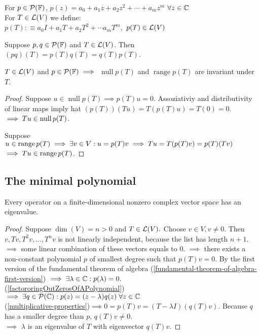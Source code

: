 \begin{mydef}
    For $p \in \mathcal{P} (\mathbb{F})$, $p(z) = a_0+a_1z+a_2z^2+\cdots+a_mz^m$
    $\forall z \in \mathbb{C}$\\
    For $T \in \mathcal{L} (V)$ we define: \\
    $p(T) :\equiv a_0 I + a_1 T + a_2 T^2 + \cdots a_m T^m,$ $p(T) \in \mathcal{L}(V)$
\end{mydef}



\setcounter{thm}{16}
\begin{thm}
    \label{multiplicative-properties}
    Suppose $p,q \in \mathcal{P} (\mathbb{F})$ and $T\in \mathcal{L} (V)$. Then $(p q)(T) = p(T) q(T) = q(T)p(T)$.
\end{thm}

\begin{thm}
    \label{null-space-and-range-of-p(T)-are-invariant-under-T}
    $T \in \mathcal{L}(V)$ and $p\in \mathcal{P} (\mathbb{F}) \implies$
    $\operatorname{null} p(T)$ and $\operatorname{range} p(T)$ are invariant under $T$.
\end{thm}
\begin{proof}
    Suppose $u\in \operatorname{null} p(T) \implies p(T)u = 0$. Assoziativiy and distributivity of linear maps imply hat $(p(T))(Tu)=T(p(T)u)=T(0)=0$.$\implies Tu \in \operatorname{null} p(T)$.

    Suppose $u \in \operatorname{range} p(T) \implies \exists v\in V: u=p(T)v \implies Tu=T(p(T)v)=p(T)(Tv)$ \\
    $\implies Tu \in \operatorname{range} p(T)$.
\end{proof}

\subsection{The minimal polynomial}

\begin{thm}
    Every operator on a finite-dimensional nonzero complex vector space has an eigenvalue.
\end{thm}
\begin{proof}
    Suppose $\dim(V)=n>0$ and $T\in \mathcal{L}(V).$ Choose $v\in V, v\neq0$. Then $v, Tv, T^2v, \dots, T^nv$ is not linearly independent, because the list has length $n+1$. $\implies$ some linear combination of these vectors equals to $0$. $\implies$ there exists a non-constant polynomial $p$ of smallest degree such that $p(T)v = 0$. By the first version of the fundamental theorem of algebra (\ref{fundamental-theorem-of-algebra-first-version}) $\implies \exists \lambda \in \mathbb{C}: p(\lambda) = 0.$\\
    (\ref{factororingOutZerosOfAPolynomial})$\implies \exists q \in \mathcal {P} (\mathbb{C}): p(z) = (z-\lambda)  q(z) \; \forall z \in \mathbb{C}$ \\
    (\ref{multiplicative-properties})$\implies 0=p(T)v=(T-\lambda I) (q(T)v)$. Because $q$ has a smaller degree than $p$, $q(T)v \neq 0$. \\
    $\implies$ $\lambda$ is an eigenvalue of $T$ with eigenvector $q(T)v$.
\end{proof}

